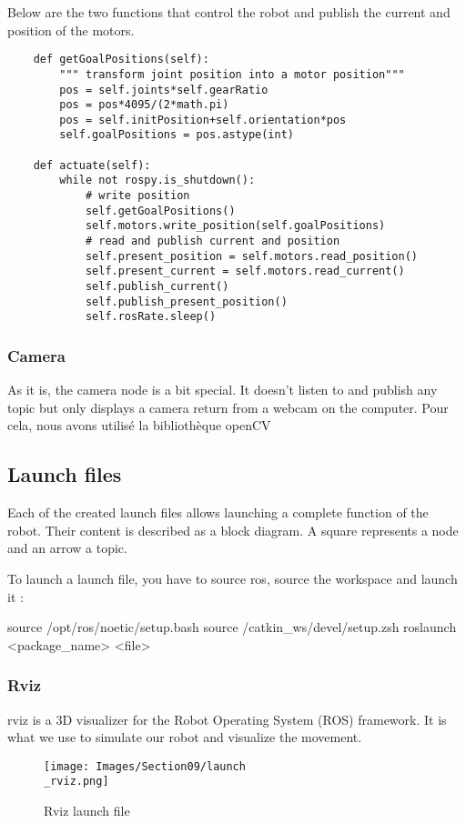 \bigbreak
Below are the two functions that control the robot and publish the current and position of the motors.
\begin{verbatim}
    def getGoalPositions(self):
        """ transform joint position into a motor position"""
        pos = self.joints*self.gearRatio
        pos = pos*4095/(2*math.pi)
        pos = self.initPosition+self.orientation*pos
        self.goalPositions = pos.astype(int)
        
    def actuate(self):
        while not rospy.is_shutdown():
            # write position
            self.getGoalPositions()
            self.motors.write_position(self.goalPositions)
            # read and publish current and position
            self.present_position = self.motors.read_position()
            self.present_current = self.motors.read_current()
            self.publish_current()
            self.publish_present_position()
            self.rosRate.sleep()
\end{verbatim}

\subsubsection{Camera}
As it is, the camera node is a bit special. It doesn't listen to and publish any topic but only displays a camera return from a webcam on the computer. Pour cela, nous avons utilisé la bibliothèque openCV

\subsection{Launch files}

Each of the created launch files allows launching a complete function of the robot. Their content is described as a block diagram. A square represents a node and an arrow a topic. 

\bigbreak
To launch a launch file, you have to source ros, source the workspace and launch it :
\begin{commandshell}
    source /opt/ros/noetic/setup.bash
    source /catkin_ws/devel/setup.zsh
    roslaunch <package_name> <file>
\end{commandshell} 

\subsubsection{Rviz}

rviz is a 3D visualizer for the Robot Operating System (ROS) framework. It is what we use to simulate our robot and visualize the movement.
\bigbreak
\begin{figure}[ht]
    \centering
    \texttt{[image: Images/Section09/launch\\\_rviz.png]}
    \caption{Rviz launch file}
    \label{fig:RvizLaunch}
\end{figure}
\FloatBarrier

